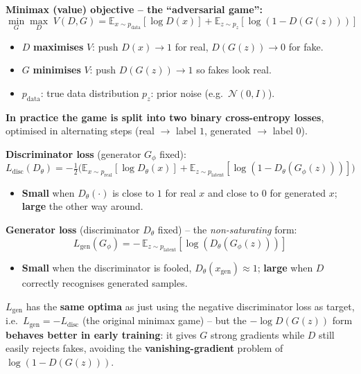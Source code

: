 \documentclass[10pt,a4paper]{article}
\begin{document}
	\begin{formulabox}
		\textbf{Minimax (value) objective -- the ``adversarial game'':}
		\[
		\min_G \max_D \; V(D,G) =
		\mathbb{E}_{x\sim p_{\text{data}}}[\log D(x)] + \mathbb{E}_{z\sim p_z}[\log(1 - D(G(z)))]
		\]
	\end{formulabox}
	\begin{itemize}[leftmargin=*]
		\item $D$ \textbf{maximises} $V$: push $D(x)\to 1$ for real, $D(G(z))\to 0$ for fake.
		\item $G$ \textbf{minimises} $V$: push $D(G(z))\to 1$ so fakes look real.
		\item $p_{\text{data}}$: true data distribution \quad $p_z$: prior noise (e.g.\ $\mathcal{N}(0,I)$).
	\end{itemize}

	\medskip
	\textbf{In practice the game is split into two binary cross-entropy losses}, optimised in alternating steps (real $\to$ label $1$, generated $\to$ label $0$).

	\begin{formulabox}
		\textbf{Discriminator loss} (generator $G_\phi$ fixed):
		\[
		L_{\text{disc}}(D_\theta) = -\tfrac{1}{2}\Big(
		\mathbb{E}_{x\sim p_{\text{real}}}[\log D_\theta(x)] +
		\mathbb{E}_{z\sim p_{\text{latent}}}[\log(1 - D_\theta(G_\phi(z)))]\Big)
		\]
	\end{formulabox}
	\begin{itemize}[leftmargin=*]
		\item \textbf{Small} when $D_\theta(\cdot)$ is close to $1$ for real $x$ and close to $0$ for generated $x$; \textbf{large} the other way around.
	\end{itemize}

	\begin{formulabox}
		\textbf{Generator loss} (discriminator $D_\theta$ fixed) -- the \emph{non-saturating} form:
		\[
		L_{\text{gen}}(G_\phi) = -\,\mathbb{E}_{z\sim p_{\text{latent}}}[\log(D_\theta(G_\phi(z)))]
		\]
	\end{formulabox}
	\begin{itemize}[leftmargin=*]
		\item \textbf{Small} when the discriminator is fooled, $D_\theta(x_{\text{gen}})\approx 1$; \textbf{large} when $D$ correctly recognises generated samples.
	\end{itemize}

	\begin{importantbox}
		$L_{\text{gen}}$ has the \textbf{same optima} as just using the negative discriminator loss as target, i.e.\ $L_{\text{gen}} = -L_{\text{disc}}$ (the original minimax game) -- but the $-\log D(G(z))$ form \textbf{behaves better in early training}: it gives $G$ strong gradients while $D$ still easily rejects fakes, avoiding the \textbf{vanishing-gradient} problem of $\log(1-D(G(z)))$.
	\end{importantbox}
\end{document}
